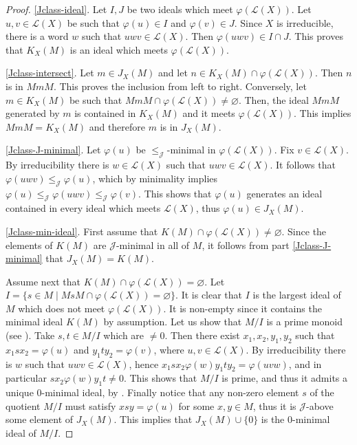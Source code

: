 \documentclass[a4paper,UKenglish,numberwithinsect,cleveref]{lipics-v2021}
\newcommand{\JJ}{\mathrel{\mathscr{J}}}
\newcommand{\cL}{\mathcal L}
\begin{document}
\begin{proof}
    \ref{Jclass-ideal}. Let $I,J$ be two ideals which meet $\varphi(\cL(X))$. Let $u,v\in\cL(X)$ be such that $\varphi(u)\in I$ and $\varphi(v)\in J$. Since $X$ is irreducible, there is a word $w$ such that $uwv\in\cL(X)$. Then $\varphi(uwv)\in I\cap J$. This proves that $K_X(M)$ is an ideal which meets $\varphi(\cL(X))$.
    
    \ref{Jclass-intersect}. Let $m\in J_X(M)$ and let $n\in K_X(M)\cap\varphi(\cL(X))$. Then $n$ is in $MmM$. This proves the inclusion from left to right. Conversely, let $m\in K_X(M)$ be such that $MmM\cap\varphi(\cL(X))\ne\varnothing$. Then, the ideal $MmM$ generated by $m$ is contained in $K_X(M)$ and it meets $\varphi(\cL(X))$. This implies $MmM=K_X(M)$ and therefore $m$ is in $J_X(M)$.

    \ref{Jclass-J-minimal}. Let $\varphi(u)$ be $\leq_{\JJ}$-minimal in $\varphi(\cL(X))$. Fix $v\in\cL(X)$. By irreducibility there is $w\in\cL(X)$ such that $uwv\in\cL(X)$. It follows that $\varphi(uwv)\leq_{\JJ}\varphi(u)$, which by minimality implies $\varphi(u)\leq_{\JJ}\varphi(uwv)\leq_{\JJ}\varphi(v)$. This shows that $\varphi(u)$ generates an ideal contained in every ideal which meets $\cL(X)$, thus $\varphi(u)\in J_X(M)$.
   
    \ref{Jclass-min-ideal}. First assume that $K(M)\cap\varphi(\cL(X))\neq\varnothing$. Since the elements of $K(M)$ are $\JJ$-minimal in all of $M$, it follows from part \ref{Jclass-J-minimal} that $J_X(M) = K(M)$.

    Assume next that $K(M)\cap\varphi(\cL(X))=\varnothing$. Let $I=\{s\in M \mid MsM\cap\varphi(\cL(X))=\varnothing\}$. It is clear that $I$ is the largest ideal of $M$ which does not meet $\varphi(\cL(X))$. It is non-empty since it contains the minimal ideal $K(M)$ by assumption. Let us show that $M/I$ is a prime monoid (see \cite[Section~1.12]{BerstelPerrinReutenauer2009}). Take $s,t\in M/I$ which are $\neq 0$. Then there exist $x_1,x_2,y_1,y_2$ such that $x_1sx_2 = \varphi(u)$ and $y_1ty_2 = \varphi(v)$, where $u,v\in\cL(X)$. By irreducibility there is $w$ such that $uwv\in\cL(X)$, hence $x_1sx_2\varphi(w)y_1ty_2 = \varphi(uvw)$, and in particular $sx_2\varphi(w)y_1t\neq 0$. This shows that $M/I$ is prime, and thus it admits a unique 0-minimal ideal, by \cite[Proposition 1.12.9]{BerstelPerrinReutenauer2009}. Finally notice that any non-zero element $s$ of the quotient $M/I$ must satisfy $xsy = \varphi(u)$ for some $x,y\in M$, thus it is $\JJ$-above some element of $J_X(M)$. This implies that $J_X(M)\cup\{0\}$ is the 0-minimal ideal of $M/I$.
\end{proof}
\end{document}
